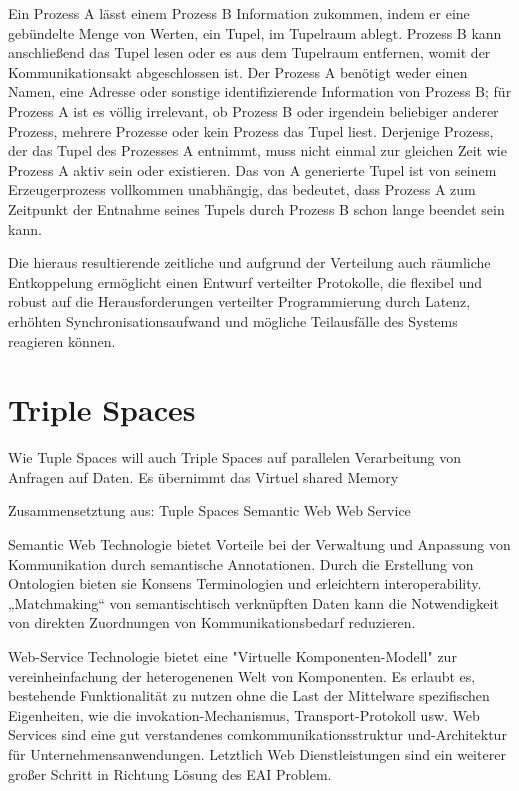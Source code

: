 \documentclass[a4paper,12pt]{scrreprt}
\begin{document}
		Ein Prozess A lässt einem Prozess B Information zukommen, indem er eine gebündelte Menge von Werten, ein Tupel, im Tupelraum ablegt. Prozess B kann anschließend das Tupel lesen oder es aus dem Tupelraum entfernen, womit der Kommunikationsakt abgeschlossen ist. Der Prozess A benötigt weder einen Namen, eine Adresse oder sonstige identifizierende Information von Prozess B; für Prozess A ist es völlig irrelevant, ob Prozess B oder irgendein beliebiger anderer Prozess, mehrere Prozesse oder kein Prozess das Tupel liest. Derjenige Prozess, der das Tupel des Prozesses A entnimmt, muss nicht einmal zur gleichen Zeit wie Prozess A aktiv sein oder existieren. Das von A generierte Tupel ist von seinem Erzeugerprozess vollkommen unabhängig, das bedeutet, dass Prozess A zum Zeitpunkt der Entnahme seines Tupels durch Prozess B schon lange beendet sein kann.
		
		Die hieraus resultierende zeitliche und aufgrund der Verteilung auch räumliche Entkoppelung ermöglicht einen Entwurf verteilter Protokolle, die flexibel und robust auf die Herausforderungen verteilter Programmierung durch Latenz, erhöhten Synchronisationsaufwand und mögliche Teilausfälle des Systems reagieren können.
		
		
		\section{Triple Spaces}
		
		Wie Tuple Spaces will auch Triple Spaces auf parallelen Verarbeitung von Anfragen auf Daten. Es übernimmt das Virtuel shared Memory 
		
		Zusammensetztung aus:
		Tuple Spaces
		Semantic Web
		Web Service
		
		
		Semantic Web Technologie bietet Vorteile bei der Verwaltung und Anpassung von Kommunikation durch semantische Annotationen. Durch die Erstellung von Ontologien bieten sie Konsens Terminologien und erleichtern interoperability. „Matchmaking“ von semantischtisch verknüpften Daten kann die Notwendigkeit von direkten Zuordnungen von Kommunikationsbedarf reduzieren.
		
		
		Web-Service Technologie bietet eine 
		"Virtuelle Komponenten-Modell" zur vereinheinfachung der 
		heterogenenen Welt von Komponenten. Es  erlaubt es, bestehende Funktionalität zu nutzen 
		ohne die Last der Mittelware spezifischen Eigenheiten, wie die invokation-Mechanismus, Transport-Protokoll usw. Web Services sind eine gut verstandenes comkommunikationsstruktur und-Architektur für Unternehmensanwendungen. Letztlich Web 
		Dienstleistungen sind ein weiterer großer Schritt in Richtung 
		Lösung des EAI Problem.
		
\end{document}
